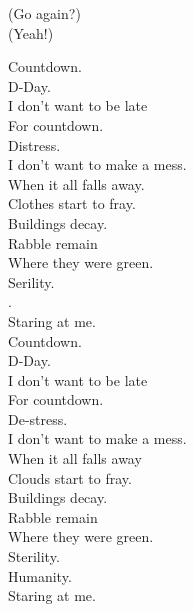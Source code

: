 
\label{album:sketches-of-brunswick-east}




(Go again?) \\
(Yeah!) \\






Countdown. \\
D-Day. \\
I don't want to be late \\
For countdown. \\
Distress. \\
I don't want to make a mess. \\

When it all falls away. \\
Clothes start to fray. \\
Buildings decay. \\
Rabble remain \\
Where they were green. \\
Serility. \\
. \\
Staring at me. \\

Countdown. \\
D-Day. \\
I don't want to be late \\
For countdown. \\
De-stress. \\
I don't want to make a mess. \\

When it all falls away \\
Clouds start to fray. \\
Buildings decay. \\
Rabble remain \\
Where they were green. \\
Sterility. \\
Humanity. \\
Staring at me. \\

